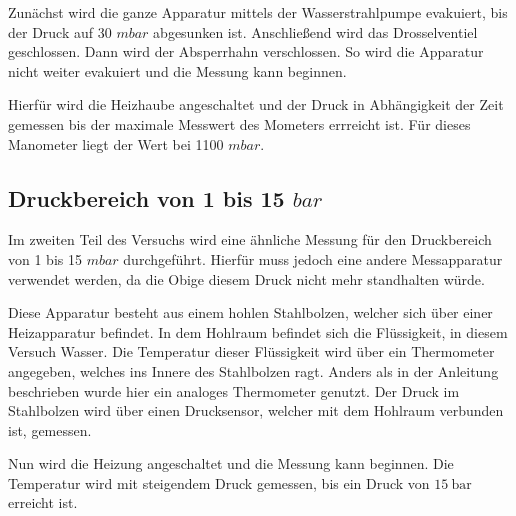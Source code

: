 Zunächst wird die ganze Apparatur mittels der Wasserstrahlpumpe evakuiert, bis der Druck auf 30 $mbar$ abgesunken ist.
Anschließend wird das Drosselventiel geschlossen.
Dann wird der Absperrhahn verschlossen.
So wird die Apparatur nicht weiter evakuiert und die Messung kann beginnen.

Hierfür wird die Heizhaube angeschaltet und der Druck in Abhängigkeit der Zeit gemessen bis der maximale Messwert des Mometers errreicht ist.
Für dieses Manometer liegt der Wert bei 1100 $mbar$.

\subsection{Druckbereich von 1 bis 15 $bar$}
Im zweiten Teil des Versuchs wird eine ähnliche Messung für den Druckbereich von 1 bis 15 $mbar$ durchgeführt.
Hierfür muss jedoch eine andere Messapparatur verwendet werden, da die Obige diesem Druck nicht mehr standhalten würde.

Diese Apparatur besteht aus einem hohlen Stahlbolzen, welcher sich über einer Heizapparatur befindet.
In dem Hohlraum befindet sich die Flüssigkeit, in diesem Versuch Wasser.
Die Temperatur dieser Flüssigkeit wird über ein Thermometer angegeben, welches ins Innere des Stahlbolzen ragt.
Anders als in der Anleitung beschrieben wurde hier ein analoges Thermometer genutzt.
Der Druck im Stahlbolzen wird über einen Drucksensor, welcher mit dem Hohlraum verbunden ist, gemessen.

Nun wird die Heizung angeschaltet und die Messung kann beginnen.
Die Temperatur wird mit steigendem Druck gemessen, bis ein Druck von $\SI{15}{\bar}$ erreicht ist.
